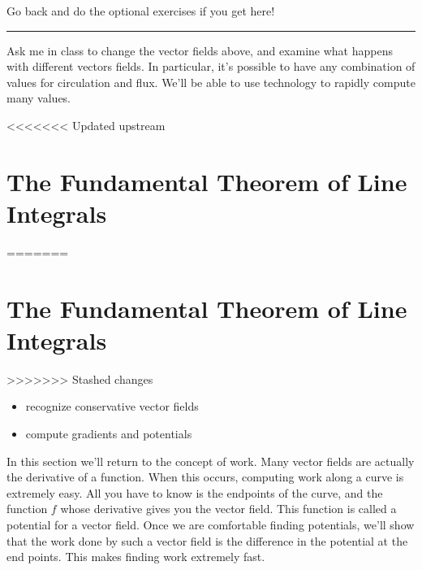 \large
Go back and do the optional exercises if you get here!
\vskip0.1in
\hrule
\normalsize
\vskip0.1in

Ask me in class to change the vector fields above, and examine what happens with different vectors fields.  In particular, it's possible to have any combination of values for circulation and flux. We'll be able to use technology to rapidly compute many values. 





%
%


<<<<<<< Updated upstream

\section{The Fundamental Theorem of Line Integrals}
=======
\section{The Fundamental Theorem of Line Integrals}

>>>>>>> Stashed changes
\begin{itemize}
\item recognize conservative vector fields
\item compute gradients and potentials
\end{itemize}

In this section we'll return to the concept of work. Many vector fields are actually the derivative of a function.  When this occurs, computing work along a curve is extremely easy.  All you have to know is the endpoints of the curve, and the function $f$ whose derivative gives you the vector field. This function is called a potential for a vector field.  Once we are comfortable finding potentials, we'll show that the work done by such a vector field is the difference in the potential at the end points.  This makes finding work extremely fast.

